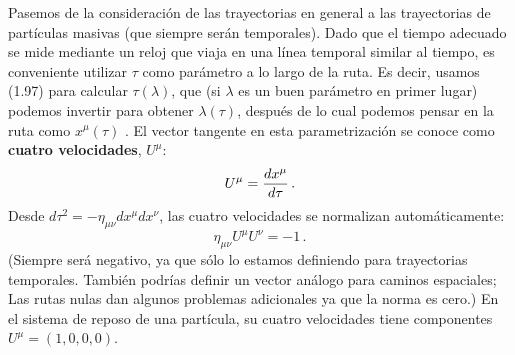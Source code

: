 \documentclass[11pt,b5paper,openany,twoside]{book}
\newcommand{\mn}{{\mu\nu}}
\begin{document}
Pasemos de la consideración de las trayectorias en general a las trayectorias de partículas masivas (que siempre serán temporales).
Dado que el tiempo adecuado se mide mediante un reloj que viaja en una línea temporal similar al tiempo, es conveniente utilizar $\tau$ como parámetro a lo largo de la ruta.
Es decir, usamos (1.97) para calcular $\tau(\lambda)$, que (si $\lambda$ es un buen parámetro en primer lugar) podemos invertir para obtener $\lambda(\tau)$, después de lo cual podemos pensar en la ruta como $x^\mu(\tau)$ .
El vector tangente en esta parametrización se conoce como {\bf cuatro velocidades}, $U^\mu$:
\begin{equation}
U^\mu = {{dx^\mu}\over{d\tau}}\,.\label{1.98}
\end{equation}
Desde $d\tau^2 = -\eta_\mn dx^\mu dx^\nu$, las cuatro velocidades se normalizan automáticamente:
\begin{equation}
\eta_\mn U^\mu U^\nu = -1\,.\label{1.99}
\end{equation}
(Siempre será negativo, ya que sólo lo estamos definiendo para trayectorias temporales.
También podrías definir un vector análogo para caminos espaciales; Las rutas nulas dan algunos problemas adicionales ya que la norma es cero.)
En el sistema de reposo de una partícula, su cuatro velocidades tiene componentes $U^\mu = (1,0,0,0)$.
\end{document}
